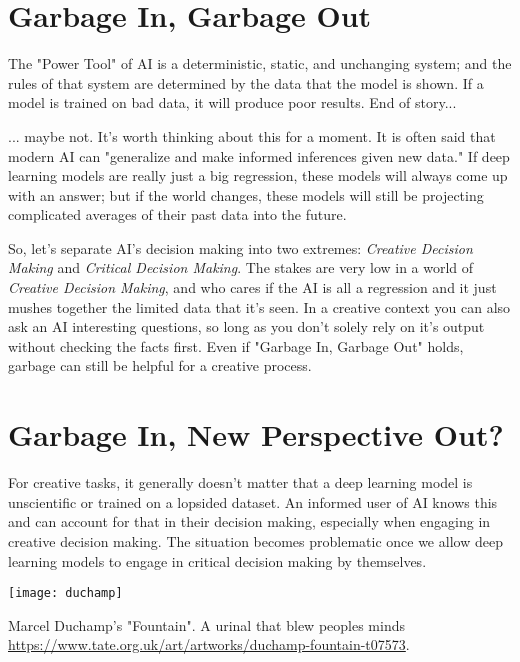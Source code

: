 \section{Garbage In, Garbage Out}

The "Power Tool" of AI is a deterministic, static, and unchanging system; and the rules of that system are determined by the data that the model is shown. If a model is trained on bad data, it will produce poor results. End of story...

... maybe not. It's worth thinking about this for a moment. It is often said that modern AI can "generalize and make informed inferences given new data." If deep learning models are really just a big regression, these models will always come up with an answer; but if the world changes, these models will still be projecting complicated averages of their past data into the future.

So, let's separate AI's decision making into two extremes: \textit{Creative Decision Making} and \textit{Critical Decision Making}. The stakes are very low in a world of \textit{Creative Decision Making}, and who cares if the AI is all a regression and it just mushes together the limited data that it's seen. In a creative context you can also ask an AI interesting questions, so long as you don't solely rely on it's output without checking the facts first. Even if "Garbage In, Garbage Out" holds, garbage can still be helpful for a creative process. 

\section{Garbage In, New Perspective Out?}

For creative tasks, it generally doesn't matter that a deep learning model is unscientific or trained on a lopsided dataset. An informed user of AI knows this and can account for that in their decision making, especially when engaging in creative decision making. The situation becomes problematic once we allow deep learning models to engage in critical decision making by themselves.

\begin{pdf}
\begin{marginfigure}[-5.5cm]
        \texttt{[image: duchamp]}
        \caption{Marcel Duchamp's "Fountain". A urinal that blew peoples minds \url{https://www.tate.org.uk/art/artworks/duchamp-fountain-t07573}.}
\end{marginfigure}
\end{pdf}

